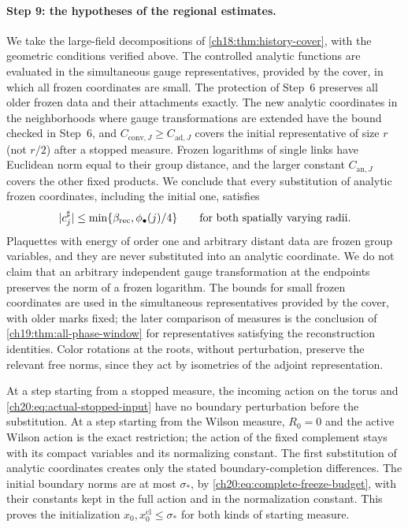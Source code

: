 \paragraph{Step 9: the hypotheses of the regional estimates.}
We take the large-field decompositions of \cref{ch18:thm:history-cover}, with the geometric conditions verified above. The controlled analytic functions are evaluated in the simultaneous gauge representatives, provided by the cover, in which all frozen coordinates are small. The protection of Step~6 preserves all older frozen data and their attachments exactly. The new analytic coordinates in the neighborhoods where gauge transformations are extended have the bound checked in Step~6, and $C_{\mathrm{conv},J}\ge C_{\mathrm{ad},J}$ covers the initial representative of size $r$ (not $r/2$) after a stopped measure. Frozen logarithms of single links have Euclidean norm equal to their group distance, and the larger constant $C_{\mathrm{an},J}$ covers the other fixed products. We conclude that every substitution of analytic frozen coordinates, including the initial one, satisfies
\begin{equation}\label{ch20:eq:actual-saved-values}
 \lvert c_j^\sharp\rvert\le\min\{\beta_{\mathrm{rec}},\phi_\bullet(j)/4\}\qquad\text{for both spatially varying radii}.
\end{equation}
Plaquettes with energy of order one and arbitrary distant data are frozen group variables, and they are never substituted into an analytic coordinate. We do not claim that an arbitrary independent gauge transformation at the endpoints preserves the norm of a frozen logarithm. The bounds for small frozen coordinates are used in the simultaneous representatives provided by the cover, with older marks fixed; the later comparison of measures is the conclusion of \cref{ch19:thm:all-phase-window} for representatives satisfying the reconstruction identities. Color rotations at the roots, without perturbation, preserve the relevant free norms, since they act by isometries of the adjoint representation.

At a step starting from a stopped measure, the incoming action on the torus and \eqref{ch20:eq:actual-stopped-input} have no boundary perturbation before the substitution. At a step starting from the Wilson measure, $R_0=0$ and the active Wilson action is the exact restriction; the action of the fixed complement stays with its compact variables and its normalizing constant. The first substitution of analytic coordinates creates only the stated boundary-completion differences. The initial boundary norms are at most $\sigma_*$, by \eqref{ch20:eq:complete-freeze-budget}, with their constants kept in the full action and in the normalization constant. This proves the initialization $x_0,x_0^{\mathrm{cl}}\le\sigma_*$ for both kinds of starting measure.

